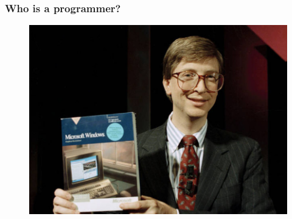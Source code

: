 \documentclass{beamer}
\begin{document}
\begin{frame}
\frametitle{Who is a programmer?}
\large




\begin{figure}
\includegraphics[scale=0.9]{gates.jpg}
\end{figure}
% 
% 
% 
% 

\end{frame}
\end{document}
